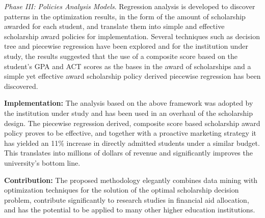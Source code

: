 \documentclass[12pt,english]{report}
\begin{document}
\vspace*{.1in} 
\noindent \textit{Phase III: Policies Analysis Models}. Regression analysis is developed to discover patterns in the optimization results, in the form of the  amount of scholarship awarded for each student, and translate them into simple and effective scholarship award policies for implementation. Several techniques such as decision tree and piecewise regression  have been explored  and for the institution under study, the results suggested that the use of a composite score based on the student's GPA and ACT scores as the bases in the award of scholarships and a simple  yet effective award scholarship policy derived piecewise regression has been discovered.

\vspace*{.15in}
\noindent \textbf{Implementation:} The analysis based on the above framework was adopted by the institution under study and has been used in an overhaul of the scholarship design. The piecewise regression derived, composite score based scholarship award policy proves to be effective, and together with a proactive marketing strategy it has yielded an 11\% increase in directly admitted students under a similar budget. This translates into millions of dollars of revenue and significantly improves the university's bottom line.

\vspace*{.15in}
\noindent \textbf{Contribution:} The proposed methodology elegantly combines data mining with optimization techniques for the solution of the optimal scholarship decision problem,  contribute significantly to research studies in financial aid allocation, and has the potential to be applied to many other higher education institutions.



\newpage 

\end{document}
